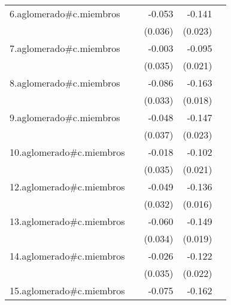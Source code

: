{\begin{longtable}{l*{4}{D{.}{.}{-1}}}
\addlinespace
6.aglomerado#c.miembros&                     &      -0.053         &      -0.141\sym{***}&                     \\
            &                     &     (0.036)         &     (0.023)         &                     \\
\addlinespace
7.aglomerado#c.miembros&                     &      -0.003         &      -0.095\sym{***}&                     \\
            &                     &     (0.035)         &     (0.021)         &                     \\
\addlinespace
8.aglomerado#c.miembros&                     &      -0.086\sym{**} &      -0.163\sym{***}&                     \\
            &                     &     (0.033)         &     (0.018)         &                     \\
\addlinespace
9.aglomerado#c.miembros&                     &      -0.048         &      -0.147\sym{***}&                     \\
            &                     &     (0.037)         &     (0.023)         &                     \\
\addlinespace
10.aglomerado#c.miembros&                     &      -0.018         &      -0.102\sym{***}&                     \\
            &                     &     (0.035)         &     (0.021)         &                     \\
\addlinespace
12.aglomerado#c.miembros&                     &      -0.049         &      -0.136\sym{***}&                     \\
            &                     &     (0.032)         &     (0.016)         &                     \\
\addlinespace
13.aglomerado#c.miembros&                     &      -0.060         &      -0.149\sym{***}&                     \\
            &                     &     (0.034)         &     (0.019)         &                     \\
\addlinespace
14.aglomerado#c.miembros&                     &      -0.026         &      -0.122\sym{***}&                     \\
            &                     &     (0.035)         &     (0.022)         &                     \\
\addlinespace
15.aglomerado#c.miembros&                     &      -0.075\sym{*}  &      -0.162\sym{***}&                     \\

\end{longtable}}
